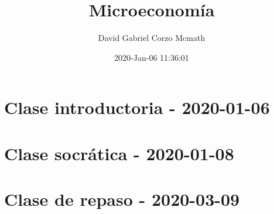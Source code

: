 \documentclass{book}
\title{Microeconomía}
\author{David Gabriel Corzo Mcmath}
\date{2020-Jan-06 11:36:01}
\begin{document}
\maketitle
\tableofcontents

\chapter{Clase introductoria - 2020-01-06}


\chapter{Clase socrática - 2020-01-08}


% 

% 

% 

\chapter{Clase de repaso - 2020-03-09}

\end{document}
